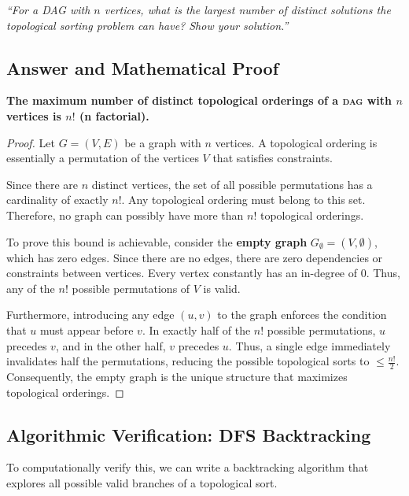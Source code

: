 \documentclass[12pt,a4paper]{article}
\theoremstyle{plain}
\theoremstyle{definition}
\theoremstyle{remark}
\newcommand{\DAG}{\textsc{dag}}
\begin{document}
\begin{infobox}
\textit{``For a DAG with $n$ vertices, what is the largest number of
distinct solutions the topological sorting problem can have?
Show your solution.''}
\end{infobox}

\subsection{Answer and Mathematical Proof}

\begin{keybox}
\textbf{The maximum number of distinct topological orderings of a
\DAG{} with $n$ vertices is $n!$ (n factorial).}
\end{keybox}

\begin{proof}
Let $G = (V, E)$ be a graph with $n$ vertices. A topological ordering is essentially a permutation of the vertices $V$ that satisfies constraints.

Since there are $n$ distinct vertices, the set of all possible permutations has a cardinality of exactly $n!$. Any topological ordering must belong to this set. Therefore, no graph can possibly have more than $n!$ topological orderings. 

To prove this bound is achievable, consider the \textbf{empty graph} $G_{\emptyset} = (V, \emptyset)$, which has zero edges. Since there are no edges, there are zero dependencies or constraints between vertices. Every vertex constantly has an in-degree of 0. Thus, any of the $n!$ possible permutations of $V$ is valid.

Furthermore, introducing any edge $(u,v)$ to the graph enforces the condition that $u$ must appear before $v$. In exactly half of the $n!$ possible permutations, $u$ precedes $v$, and in the other half, $v$ precedes $u$. Thus, a single edge immediately invalidates half the permutations, reducing the possible topological sorts to $\leq \frac{n!}{2}$. Consequently, the empty graph is the unique structure that maximizes topological orderings.
\end{proof}

\subsection{Algorithmic Verification: DFS Backtracking}

To computationally verify this, we can write a backtracking algorithm that explores all possible valid branches of a topological sort. 
\end{document}
